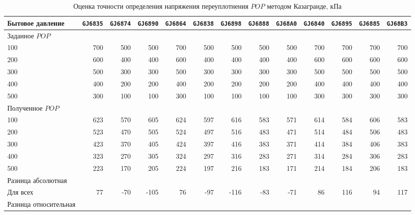 \begin{sidewaystable}[p]
    \centering
    \small
    \caption{Оценка точности определения напряжения переуплотнения $POP$ методом Казагранде, кПа} \label{tab:pop-caz}
    \begin{tabular}{@{}lrrrrrrrrrrrr@{}}
    \toprule
    Бытовое давление & \texttt{GJ6835} & \texttt{GJ6874} & \texttt{GJ6890} & \texttt{GJ6864} & \texttt{GJ6838} & \texttt{GJ6898} & \texttt{GJ6888} & \texttt{GJ68A0} & \texttt{GJ6840} & \texttt{GJ6895} & \texttt{GJ6885} & \texttt{GJ68B3} \\
    \midrule
    Заданное $POP$ &  &  &  &  &  &  &  &  &  &  &  &  \\
    100 & 700 & 500 & 500 & 700 & 500 & 500 & 500 & 500 & 700 & 700 & 700 & 700 \\
    200 & 600 & 400 & 400 & 600 & 400 & 400 & 400 & 400 & 600 & 600 & 600 & 600 \\
    300 & 500 & 300 & 300 & 500 & 300 & 300 & 300 & 300 & 500 & 500 & 500 & 500 \\
    400 & 400 & 200 & 200 & 400 & 200 & 200 & 200 & 200 & 400 & 400 & 400 & 400 \\
    500 & 300 & 100 & 100 & 300 & 100 & 100 & 100 & 100 & 300 & 300 & 300 & 300 \\
    \midrule
    Полученное $POP$  &  &  &  &  &  &  &  &  &  &  &  &  \\
    100 & 623 & 570 & 605 & 624 & 597 & 616 & 583 & 571 & 614 & 584 & 606 & 583 \\
    200 & 523 & 470 & 505 & 524 & 497 & 516 & 483 & 471 & 514 & 484 & 506 & 483 \\
    300 & 423 & 370 & 405 & 424 & 397 & 416 & 383 & 371 & 414 & 384 & 406 & 383 \\
    400 & 323 & 270 & 305 & 324 & 297 & 316 & 283 & 271 & 314 & 284 & 306 & 283 \\
    500 & 223 & 170 & 205 & 224 & 197 & 216 & 183 & 171 & 214 & 184 & 206 & 183 \\
    \midrule
    Разница абсолютная &  &  &  &  &  &  &  &  &  &  &  &  \\
    Для всех & 77 & -70 & -105 & 76 & -97 & -116 & -83 & -71 & 86 & 116 & 94 & 117 \\
    \midrule
    Разница относительная &  &  &  &  &  &  &  &  &  &  &  &  \\

\end{tabular}
\end{sidewaystable}
